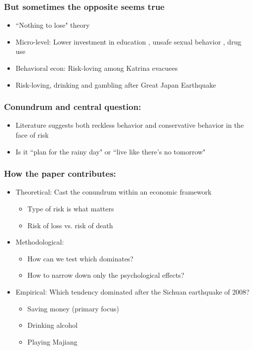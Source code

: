 \documentclass[aspectratio=169]{beamer}
\begin{document}
\begin{frame}
    \frametitle{\LARGE{But sometimes the opposite seems true}}
	\begin{itemize}
		\item ``Nothing to lose" theory \citep{Harris2002} 
		\item Micro-level: Lower investment in education \citep{Fortson2011}, unsafe sexual behavior \citep{Oster2012}, drug use \citep{Gibbons2004}
		\item Behavioral econ: Risk-loving among Katrina evacuees \citep{Eckel2009} 
		\item Risk-loving, drinking and gambling after Great Japan Earthquake \citep{Hanaoka2018}  
	\end{itemize}
\end{frame} 


\begin{frame}
    \frametitle{\LARGE{Conundrum and central question:}}
	\begin{itemize}
		\item Literature suggests both reckless behavior and conservative behavior in the face of risk 
		\item Is it ``plan for the rainy day" or ``live like there's no tomorrow" 
	\end{itemize}
\end{frame} 

\begin{frame}
    \frametitle{\LARGE{How the paper contributes:}}
	\begin{itemize}
		\item Theoretical: Cast the conundrum within an economic framework
	    \begin{itemize}
		    \item Type of risk is what matters
		    \item Risk of loss vs. risk of death
		\end{itemize}
		\item Methodological: 
		    \begin{itemize} 
		        \item How can we test which dominates?
		        \item How to narrow down only the psychological effects?
		    \end{itemize}
		\item Empirical: Which tendency dominated after the Sichuan earthquake of 2008?
		\begin{itemize}
		    \item Saving money (primary focus)
		    \item Drinking alcohol
		    \item Playing Majiang
		\end{itemize}
	\end{itemize}
\end{frame} 
\end{document}
